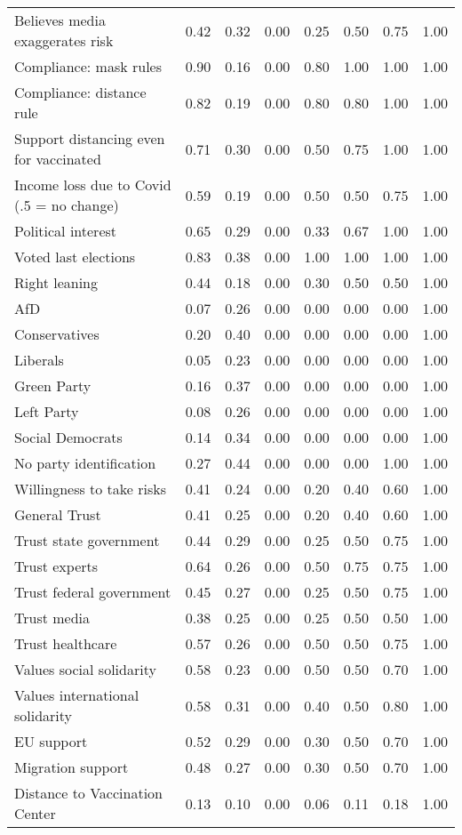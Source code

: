 \begin{table}
{\begin{tabular}[t]{lrrrrrrr}
Believes media exaggerates risk & 0.42 & 0.32 & 0.00 & 0.25 & 0.50 & 0.75 & 1.00\\
Compliance: mask rules & 0.90 & 0.16 & 0.00 & 0.80 & 1.00 & 1.00 & 1.00\\
Compliance: distance rule & 0.82 & 0.19 & 0.00 & 0.80 & 0.80 & 1.00 & 1.00\\
Support distancing even for vaccinated & 0.71 & 0.30 & 0.00 & 0.50 & 0.75 & 1.00 & 1.00\\
Income loss due to Covid (.5 = no change) & 0.59 & 0.19 & 0.00 & 0.50 & 0.50 & 0.75 & 1.00\\
Political interest & 0.65 & 0.29 & 0.00 & 0.33 & 0.67 & 1.00 & 1.00\\
Voted last elections & 0.83 & 0.38 & 0.00 & 1.00 & 1.00 & 1.00 & 1.00\\
Right leaning & 0.44 & 0.18 & 0.00 & 0.30 & 0.50 & 0.50 & 1.00\\
AfD & 0.07 & 0.26 & 0.00 & 0.00 & 0.00 & 0.00 & 1.00\\
Conservatives & 0.20 & 0.40 & 0.00 & 0.00 & 0.00 & 0.00 & 1.00\\
Liberals & 0.05 & 0.23 & 0.00 & 0.00 & 0.00 & 0.00 & 1.00\\
Green Party & 0.16 & 0.37 & 0.00 & 0.00 & 0.00 & 0.00 & 1.00\\
Left Party & 0.08 & 0.26 & 0.00 & 0.00 & 0.00 & 0.00 & 1.00\\
Social Democrats & 0.14 & 0.34 & 0.00 & 0.00 & 0.00 & 0.00 & 1.00\\
No party identification & 0.27 & 0.44 & 0.00 & 0.00 & 0.00 & 1.00 & 1.00\\
Willingness to take risks & 0.41 & 0.24 & 0.00 & 0.20 & 0.40 & 0.60 & 1.00\\
General Trust & 0.41 & 0.25 & 0.00 & 0.20 & 0.40 & 0.60 & 1.00\\
Trust state government & 0.44 & 0.29 & 0.00 & 0.25 & 0.50 & 0.75 & 1.00\\
Trust experts & 0.64 & 0.26 & 0.00 & 0.50 & 0.75 & 0.75 & 1.00\\
Trust federal government & 0.45 & 0.27 & 0.00 & 0.25 & 0.50 & 0.75 & 1.00\\
Trust media & 0.38 & 0.25 & 0.00 & 0.25 & 0.50 & 0.50 & 1.00\\
Trust healthcare & 0.57 & 0.26 & 0.00 & 0.50 & 0.50 & 0.75 & 1.00\\
Values social solidarity & 0.58 & 0.23 & 0.00 & 0.50 & 0.50 & 0.70 & 1.00\\
Values international solidarity & 0.58 & 0.31 & 0.00 & 0.40 & 0.50 & 0.80 & 1.00\\
EU support & 0.52 & 0.29 & 0.00 & 0.30 & 0.50 & 0.70 & 1.00\\
Migration support & 0.48 & 0.27 & 0.00 & 0.30 & 0.50 & 0.70 & 1.00\\
Distance to Vaccination Center & 0.13 & 0.10 & 0.00 & 0.06 & 0.11 & 0.18 & 1.00\\
\bottomrule
\end{tabular}}
\end{table}
